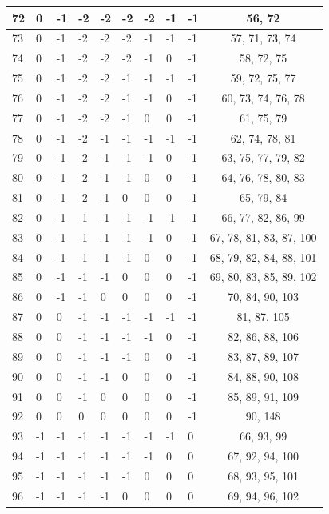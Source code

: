 \begin{longtable}{|l|l|l|l|l|l|l|l|l|c|}
72 & 0 & -1 & -2 & -2 & -2 & -2 & -1 & -1 & 56, 72 \\ \hline
73 & 0 & -1 & -2 & -2 & -2 & -1 & -1 & -1 & 57, 71, 73, 74 \\ \hline
74 & 0 & -1 & -2 & -2 & -2 & -1 & 0 & -1 & 58, 72, 75 \\ \hline
75 & 0 & -1 & -2 & -2 & -1 & -1 & -1 & -1 & 59, 72, 75, 77 \\ \hline
76 & 0 & -1 & -2 & -2 & -1 & -1 & 0 & -1 & 60, 73, 74, 76, 78 \\ \hline
77 & 0 & -1 & -2 & -2 & -1 & 0 & 0 & -1 & 61, 75, 79 \\ \hline
78 & 0 & -1 & -2 & -1 & -1 & -1 & -1 & -1 & 62, 74, 78, 81 \\ \hline
79 & 0 & -1 & -2 & -1 & -1 & -1 & 0 & -1 & 63, 75, 77, 79, 82 \\ \hline
80 & 0 & -1 & -2 & -1 & -1 & 0 & 0 & -1 & 64, 76, 78, 80, 83 \\ \hline
81 & 0 & -1 & -2 & -1 & 0 & 0 & 0 & -1 & 65, 79, 84 \\ \hline
82 & 0 & -1 & -1 & -1 & -1 & -1 & -1 & -1 & 66, 77, 82, 86, 99 \\ \hline
83 & 0 & -1 & -1 & -1 & -1 & -1 & 0 & -1 & 67, 78, 81, 83, 87, 100 \\ \hline
84 & 0 & -1 & -1 & -1 & -1 & 0 & 0 & -1 & 68, 79, 82, 84, 88, 101 \\ \hline
85 & 0 & -1 & -1 & -1 & 0 & 0 & 0 & -1 & 69, 80, 83, 85, 89, 102 \\ \hline
86 & 0 & -1 & -1 & 0 & 0 & 0 & 0 & -1 & 70, 84, 90, 103 \\ \hline
87 & 0 & 0 & -1 & -1 & -1 & -1 & -1 & -1 & 81, 87, 105 \\ \hline
88 & 0 & 0 & -1 & -1 & -1 & -1 & 0 & -1 & 82, 86, 88, 106 \\ \hline
89 & 0 & 0 & -1 & -1 & -1 & 0 & 0 & -1 & 83, 87, 89, 107 \\ \hline
90 & 0 & 0 & -1 & -1 & 0 & 0 & 0 & -1 & 84, 88, 90, 108 \\ \hline
91 & 0 & 0 & -1 & 0 & 0 & 0 & 0 & -1 & 85, 89, 91, 109 \\ \hline
92 & 0 & 0 & 0 & 0 & 0 & 0 & 0 & -1 & 90, 148 \\ \hline
93 & -1 & -1 & -1 & -1 & -1 & -1 & -1 & 0 & 66, 93, 99 \\ \hline
94 & -1 & -1 & -1 & -1 & -1 & -1 & 0 & 0 & 67, 92, 94, 100 \\ \hline
95 & -1 & -1 & -1 & -1 & -1 & 0 & 0 & 0 & 68, 93, 95, 101 \\ \hline
96 & -1 & -1 & -1 & -1 & 0 & 0 & 0 & 0 & 69, 94, 96, 102 \\ \hline

\end{longtable}
